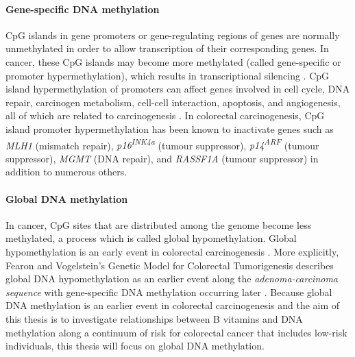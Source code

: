 \paragraph{Gene-specific DNA methylation} %
CpG islands in gene promoters or gene-regulating regions of genes are normally unmethylated in order to allow transcription of their corresponding genes. In cancer, these CpG islands may become more methylated (called gene-specific or promoter hypermethylation), which results in transcriptional silencing \cite{c185}. CpG island hypermethylation of promoters can affect genes involved in cell cycle, DNA repair, carcinogen metabolism, cell-cell interaction, apoptosis, and angiogenesis, all of which are related to carcinogenesis \cite{c182}. In colorectal carcinogenesis, CpG island promoter hypermethylation has been known to inactivate genes such as \textit{MLH1} (mismatch repair), \textit{p16\textsuperscript{INK4a}} (tumour suppressor), \textit{p14\textsuperscript{ARF}} (tumour suppressor), \textit{MGMT} (DNA repair), and \textit{RASSF1A} (tumour suppressor) \cite{c186,c187} in addition to numerous others.

\paragraph{Global DNA methylation} %
In cancer, CpG sites that are distributed among the genome become less methylated, a process which is called global hypomethylation. Global hypomethylation is an early event in colorectal carcinogenesis \cite{c188,c189}. More explicitly, Fearon and Vogelstein's Genetic Model for Colorectal Tumorigenesis describes global DNA hypomethylation as an earlier event along the \textit{adenoma-carcinoma sequence} with gene-specific DNA methylation occurring later \cite{c14}. Because global DNA methylation is an earlier event in colorectal carcinogenesis and the aim of this thesis is to investigate relationships between B vitamins and DNA methylation along a continuum of risk for colorectal cancer that includes low-risk individuals, this thesis will focus on global DNA methylation.

